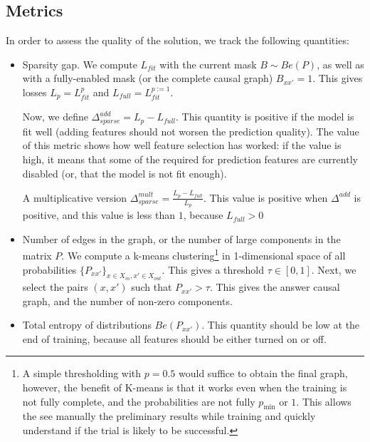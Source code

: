 \documentclass[a4paper,11pt,oneside]{report}
\begin{document}
\subsection{Metrics}
In order to assess the quality of the solution, we track the following quantities:
\begin{itemize}
    \item Sparsity gap. We compute $L_{fit}$ with the current mask $B\sim Be(P)$, as well as with a fully-enabled mask (or the complete causal graph) $B_{xx'}=1$. This gives losses $L_p=L_{fit}^{p}$ and $L_{full}=L_{fit}^{p:=1}$.

    Now, we define $\Delta^{add}_{sparse}=L_p-L_{full}$. This quantity is positive if the model is fit well (adding features should not worsen the prediction quality). The value of this metric shows how well feature selection has worked: if the value is high, it means that some of the required for prediction features are currently disabled (or, that the model is not fit enough).

    A multiplicative version $\Delta^{mult}_{sparse}=\frac{L_p-L_{full}}{L_p}$. This value is positive when $\Delta^{add}$ is positive, and this value is less than $1$, because $L_{full}>0$

    \item Number of edges in the graph, or the number of large components in the matrix $P$. We compute a k-means clustering\footnote{A simple thresholding with $p=0.5$ would suffice to obtain the final graph, however, the benefit of K-means is that it works even when the training is not fully complete, and the probabilities are not fully $p_{\min}$ or $1$. This allows the see manually the preliminary results while training and quickly understand if the trial is likely to be successful.} in 1-dimensional space of all probabilities $\{P_{xx'}\}_{x\in X_{in},x'\in X_{out}}$. This gives a threshold $\tau\in[0,1]$. Next, we select the pairs $(x, x')$ such that $P_{xx'}>\tau$. This gives the answer causal graph, and the number of non-zero components.

    \item Total entropy of distributions $Be(P_{xx'})$. This quantity should be low at the end of training, because all features should be either turned on or off.
\end{itemize}
\end{document}
